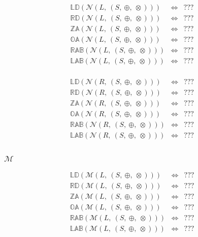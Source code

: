 \documentclass[10pt]{article}
\newcommand{\propname}[1]{{\mathbb{#1}}}
\begin{document}
\[
\begin{array}{rcl} 
\propname{LD}(\mathcal{N}(L,\ (S,\ \oplus,\ \otimes))) 
    & \Leftrightarrow 
    & ???
    \\ 
\propname{RD}(\mathcal{N}(L,\ (S,\ \oplus,\ \otimes))) 
    & \Leftrightarrow 
    & ???
    \\ 
\propname{ZA}(\mathcal{N}(L,\ (S,\ \oplus,\ \otimes))) 
    & \Leftrightarrow 
    & ???
    \\ 
\propname{OA}(\mathcal{N}(L,\ (S,\ \oplus,\ \otimes))) 
    & \Leftrightarrow 
    & ???
    \\ 
\propname{RAB}(\mathcal{N}(L,\ (S,\ \oplus,\ \otimes))) 
    & \Leftrightarrow 
    & ???
    \\ 
\propname{LAB}(\mathcal{N}(L,\ (S,\ \oplus,\ \otimes))) 
    & \Leftrightarrow 
    & ???
    \\ 
\end{array} 
\] 


\[
\begin{array}{rcl} 
\propname{LD}(\mathcal{N}(R,\ (S,\ \oplus,\ \otimes))) 
    & \Leftrightarrow 
    & ???
    \\ 
\propname{RD}(\mathcal{N}(R,\ (S,\ \oplus,\ \otimes))) 
    & \Leftrightarrow 
    & ???
    \\ 
\propname{ZA}(\mathcal{N}(R,\ (S,\ \oplus,\ \otimes))) 
    & \Leftrightarrow 
    & ???
    \\ 
\propname{OA}(\mathcal{N}(R,\ (S,\ \oplus,\ \otimes))) 
    & \Leftrightarrow 
    & ???
    \\ 
\propname{RAB}(\mathcal{N}(R,\ (S,\ \oplus,\ \otimes))) 
    & \Leftrightarrow 
    & ???
    \\ 
\propname{LAB}(\mathcal{N}(R,\ (S,\ \oplus,\ \otimes))) 
    & \Leftrightarrow 
    & ???
    \\ 
\end{array} 
\] 


\subsubsection{$\mathcal{M}$} 

\[
\begin{array}{rcl} 
\propname{LD}(\mathcal{M}(L,\ (S,\ \oplus,\ \otimes))) 
    & \Leftrightarrow 
    & ???
    \\ 
\propname{RD}(\mathcal{M}(L,\ (S,\ \oplus,\ \otimes))) 
    & \Leftrightarrow 
    & ???
    \\ 
\propname{ZA}(\mathcal{M}(L,\ (S,\ \oplus,\ \otimes))) 
    & \Leftrightarrow 
    & ???
    \\ 
\propname{OA}(\mathcal{M}(L,\ (S,\ \oplus,\ \otimes))) 
    & \Leftrightarrow 
    & ???
    \\ 
\propname{RAB}(\mathcal{M}(L,\ (S,\ \oplus,\ \otimes))) 
    & \Leftrightarrow 
    & ???
    \\ 
\propname{LAB}(\mathcal{M}(L,\ (S,\ \oplus,\ \otimes))) 
    & \Leftrightarrow 
    & ???
    \\ 
\end{array} 
\] 
\end{document}
